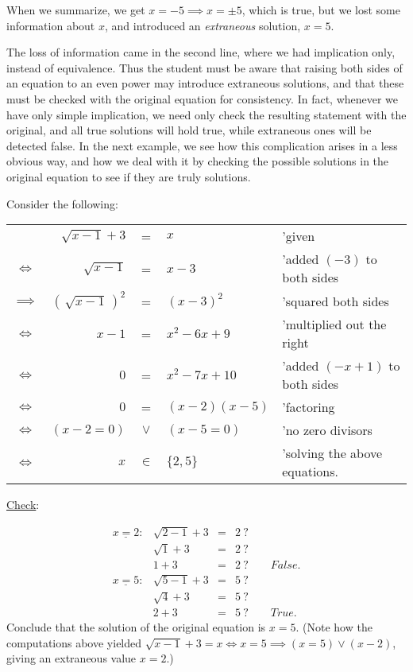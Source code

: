  When we summarize, we get $x=-5\implies x=\pm5$, which
is true, but we lost some information about $x$, and introduced 
an {\em extraneous} solution, $x=5$.  
\eex

The loss
of information came in the second line, where  we had implication
only, instead of equivalence.   Thus the student must be aware
that raising both sides of an equation to an even power may introduce
extraneous solutions, and that these must be checked with the original
equation for consistency.  In fact, whenever we have only simple
implication, we need only check the resulting statement
 with the original, and all true solutions will hold true,
while extraneous ones will be detected false.  In the next example,
we see how this complication arises in a less obvious way, and 
how we deal with it by checking the possible solutions in the 
original equation to see if they are truly solutions. 

\bex Consider the following:
 
\noindent\begin{tabular}{crcll}
& $\sqrt{x-1}+3$&=&$x$ &'given\\
$\iff$ &$\sqrt{x-1}$&=&$x-3$&'added $(-3)$ to both sides\\
$\implies$ &$\left(\,\sqrt{x-1}\,\right)^2$ &=& $(x-3)^2$ &'squared both sides\\
$\iff$ & $x-1$ &=& $x^2-6x+9$ &'multiplied out the right\\
$\iff$ &$0$&=& $x^2-7x+10$ &'added $(-x+1)$ to both sides\\
$\iff$ &$0$&=&$(x-2)(x-5)$ &'factoring\\
$\iff$ &$(x-2=0)$&$\vee$& $(x-5=0)$&'no zero divisors\\
$\iff$ &$x$&$\in$&$\{2,5\}$&'solving the above equations.
\end{tabular}

\qquad\underline{Check}:

$$\begin{array}{lrcl}
\underline{x=2}:&\sqrt{2-1}+3&=&2\ ?\\
&\sqrt1+3&=&2 \ ?\\
&1+3&=&2\ ?\qquad \textstyle{False.}\\
\underline{x=5}:&\sqrt{5-1}+3&=&5\ ?\\
&\sqrt4+3&=&5\ ?\\
&2+3&=&5\ ?\qquad\textstyle{True.}
\end{array}$$
Conclude that the solution of the original equation is $x=5$.
(Note how the computations above yielded
$\sqrt{x-1}+3=x\iff x=5\implies (x=5)\vee(x-2)$, giving an
extraneous value $x=2$.)
 
